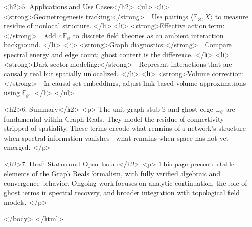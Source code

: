   <h2>5. Applications and Use Cases</h2>
  <ul>
    <li>
      <strong>Geometrogenesis tracking:</strong> Use pairings \(\langle \mathbb E_\varnothing, X \rangle\) to measure residue of nonlocal structure.
    </li>
    <li>
      <strong>Effective action term:</strong> Add \(c\,\mathbb E_\varnothing\) to discrete field theories as an ambient interaction background.
    </li>
    <li>
      <strong>Graph diagnostics:</strong> Compare spectral energy and edge count; ghost content is the difference.
    </li>
    <li>
      <strong>Dark sector modeling:</strong> Represent interactions that are causally real but spatially unlocalized.
    </li>
    <li>
      <strong>Volume correction:</strong> In causal set embeddings, adjust link-based volume approximations using \(\mathbb E_\varnothing\).
    </li>
  </ul>

  <h2>6. Summary</h2>
  <p>
    The unit graph stub \(\mathbb S\) and ghost edge \(\mathbb E_\varnothing\) are fundamental within Graph Reals. They model the residue of connectivity stripped of spatiality. These terms encode what remains of a network’s structure when spectral information vanishes—what remains when space has not yet emerged.
  </p>

  <h2>7. Draft Status and Open Issues</h2>
  <p>
    This page presents stable elements of the Graph Reals formalism, with fully verified algebraic and convergence behavior. Ongoing work focuses on analytic continuation, the role of ghost terms in spectral recovery, and broader integration with topological field models.
  </p>

</body>
</html>


